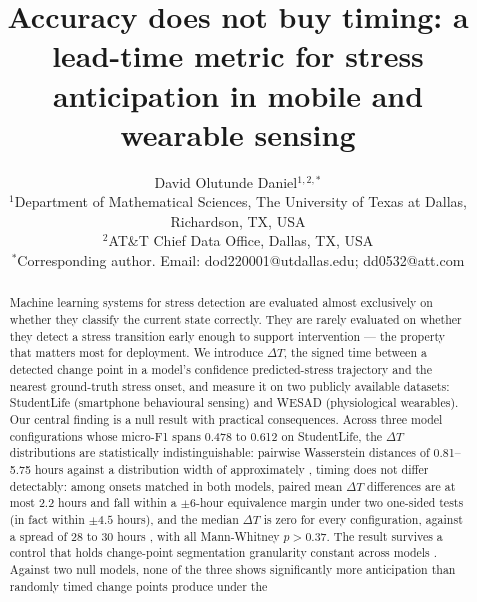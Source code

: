 \documentclass[preprint,12pt,authoryear]{elsarticle}
\newcommand{\dt}{$\Delta T$}
\providecommand{\DIFaddtex}[1]{{\protect\color{blue} \sf #1}} %
\providecommand{\DIFdeltex}[1]{{\protect\color{red} \scriptsize #1}} %
\providecommand{\DIFaddbegin}{} %
\providecommand{\DIFaddend}{} %
\providecommand{\DIFdelbegin}{} %
\providecommand{\DIFdelend}{} %
\providecommand{\DIFadd}[1]{\texorpdfstring{\DIFaddtex{#1}}{#1}} %
\providecommand{\DIFdel}[1]{\texorpdfstring{\DIFdeltex{#1}}{}} %
\newcommand{\DIFscaledelfig}{0.5}
\newlength{\DIFdelgraphicswidth} %
\newlength{\DIFdelgraphicsheight} %
\newcommand{\DIFaddincludegraphics}[2][]{{\color{blue}\fbox{\DIFOincludegraphics[#1]{#2}}}} %
\newcommand{\DIFdelincludegraphics}[2][]{%
\sbox{\DIFdelgraphicsbox}{\DIFOincludegraphics[#1]{#2}}%
\settoboxwidth{\DIFdelgraphicswidth}{\DIFdelgraphicsbox} %
\settoboxtotalheight{\DIFdelgraphicsheight}{\DIFdelgraphicsbox} %
\scalebox{\DIFscaledelfig}{%
\parbox[b]{\DIFdelgraphicswidth}{\usebox{\DIFdelgraphicsbox}\\[-\baselineskip] \rule{\DIFdelgraphicswidth}{0em}}\llap{\resizebox{\DIFdelgraphicswidth}{\DIFdelgraphicsheight}{%
\setlength{\unitlength}{\DIFdelgraphicswidth}%
\begin{picture}(1,1)%
\thicklines\linethickness{2pt} %
{\color[rgb]{1,0,0}\put(0,0){\framebox(1,1){}}}%
{\color[rgb]{1,0,0}\put(0,0){\line( 1,1){1}}}%
{\color[rgb]{1,0,0}\put(0,1){\line(1,-1){1}}}%
\end{picture}%
}\hspace*{3pt}}} %
} %
\DeclareRobustCommand{\DIFaddbegin}{\DIFOaddbegin \let\includegraphics\DIFaddincludegraphics} %
\DeclareRobustCommand{\DIFaddend}{\DIFOaddend \let\includegraphics\DIFOincludegraphics} %
\DeclareRobustCommand{\DIFdelbegin}{\DIFOdelbegin \let\includegraphics\DIFdelincludegraphics} %
\DeclareRobustCommand{\DIFdelend}{\DIFOaddend \let\includegraphics\DIFOincludegraphics} %
\begin{document}
\begin{frontmatter}

\title{Accuracy does not buy timing: a lead-time metric for stress
anticipation in mobile \DIFdelbegin \DIFdel{and wearable }\DIFdelend sensing}

\author{David Olutunde Daniel$^{1,2,*}$\\[6pt]
\normalfont
$^1$Department of Mathematical Sciences, The University of Texas at Dallas, Richardson, TX, USA\\
$^2$AT\&T Chief Data Office, Dallas, TX, USA\\
$^*$Corresponding author. Email: dod220001@utdallas.edu; dd0532@att.com}

\begin{abstract}
Machine learning systems for stress detection are evaluated almost
exclusively on whether they classify the current state correctly. They
are rarely evaluated on whether they detect a stress transition early
enough to support intervention --- the property that matters most for
deployment. We introduce \dt{}, the signed time between a detected
change point in a model's \DIFdelbegin \DIFdel{confidence }\DIFdelend \DIFaddbegin \DIFadd{predicted-stress }\DIFaddend trajectory and the nearest
ground-truth stress onset, and measure it on \DIFdelbegin \DIFdel{two publicly available
datasets: }\DIFdelend StudentLife (smartphone
behavioural sensing)\DIFdelbegin \DIFdel{and WESAD
(physiological wearables)}\DIFdelend . Our central finding is a null result with
practical consequences. Across three model configurations whose
micro-F1 spans 0.478 to \DIFdelbegin \DIFdel{0.612 on StudentLife, the \dt{} distributions
are statistically indistinguishable: pairwise Wasserstein distances of
0.81--5.75 hours against a distribution width of approximately }\DIFdelend \DIFaddbegin \DIFadd{0.611, timing does not differ detectably: among
onsets matched in both models, paired mean \dt{} differences are at
most 2.2 hours and fall within a $\pm 6$-hour equivalence margin under
two one-sided tests (in fact within $\pm 4.5$ hours), and the median
\dt{} is zero for every configuration, against a spread of 28 to }\DIFaddend 30
hours\DIFdelbegin \DIFdel{, with all Mann-Whitney $p > 0.37$.
The result survives a control
that holds change-point segmentation granularity constant across
models }\DIFdelend \DIFaddbegin \DIFadd{. Against two null models, none of the three shows significantly
more anticipation than randomly timed change points produce under the
}
\end{abstract}
\end{frontmatter}
\end{document}
